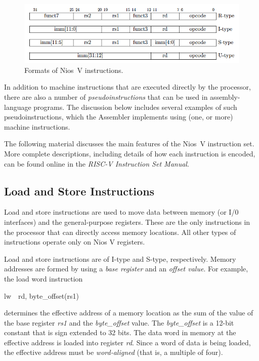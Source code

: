 \documentclass[11pt, twoside, pdftex]{article}
\begin{document}
\begin{figure}[H]
   \begin{center}
      \includegraphics[scale=.55]{figures/insts.png}
   \caption{Formats of Nios~V instructions.} 
	 \label{fig:insts}
	 \end{center}
\end{figure}

In addition to machine instructions that are
executed directly by the processor, there are also a number of {\it pseudoinstructions} that
can be used in assembly-language programs.  The discussion below includes several examples 
of such pseudoinstructions, which the Assembler implements using (one, or more) machine 
instructions.

The following material discusses the main features of the Nios~V instruction set.
More complete descriptions, including details of how each instruction
is encoded, can be found online in the {\it RISC-V Instruction Set Manual}.

\subsection{Load and Store Instructions}

Load and store instructions are used to move data between memory (or I/0 interfaces)
and the general-purpose registers. These are the only instructions in the processor that can
directly access memory locations. All other types of instructions operate only on Nios V
registers. 

Load and store instructions are of I-type and S-type, respectively. Memory addresses are
formed by using a {\it base register} and an {\it offset value}. For example, the load word 
instruction
\vspace{-\baselineskip}
\begin{center}
{\sf lw~~rd, byte\_offset(rs1)}
\end{center}
\noindent
determines the effective address of a memory location as the sum of the value of the base
register {\it rs1} and the {\it byte\_offset} value. The {\it byte\_offset} is a 12-bit 
constant that is sign extended to 32 bits. The data word in memory at the effective address 
is loaded into register {\it rd}. Since a word of data is being loaded, the effective 
address must be {\it word-aligned} (that is, a multiple of four). 
\end{document}
